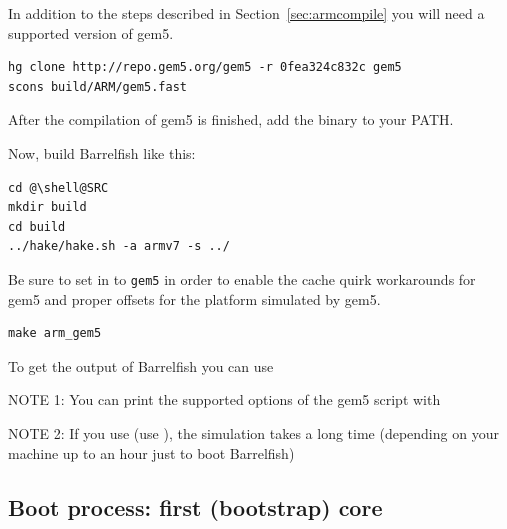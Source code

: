 \documentclass[a4paper,twoside]{report} %
\begin{document}
In addition to the steps described in Section~\ref{sec:armcompile} you
will need a supported version of gem5.

\begin{lstlisting}
hg clone http://repo.gem5.org/gem5 -r 0fea324c832c gem5
scons build/ARM/gem5.fast
\end{lstlisting}
After the compilation of gem5 is finished, add the binary to your PATH.

Now, build Barrelfish like this:
\begin{lstlisting}
cd @\shell@SRC
mkdir build
cd build
../hake/hake.sh -a armv7 -s ../
\end{lstlisting}

Be sure to set  in
 to \texttt{gem5} in order to enable
the cache quirk workarounds for gem5 and proper offsets for the
platform simulated by gem5.

\begin{lstlisting}
make arm_gem5
\end{lstlisting}

To get the output of Barrelfish you can use 

NOTE 1: You can print the supported options of the gem5 script with

NOTE 2: If you use  (use ), the simulation takes a long time (depending on
your machine up to an hour just to boot Barrelfish)

\subsection{Boot process: first (bootstrap) core}

\end{document}
